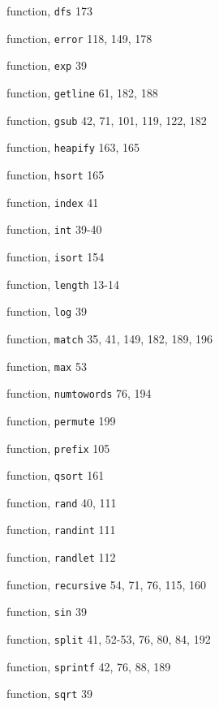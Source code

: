 \begin{multicols}{3}
\hangindent=4pc  function, \verb'dfs' 173

\hangindent=4pc  function, \verb'error' 118, 149, 178

\hangindent=4pc  function, \verb'exp' 39

\hangindent=4pc  function, \verb'getline' 61, 182, 188

\hangindent=4pc  function, \verb'gsub' 42, 71, 101, 119, 122, 182

\hangindent=4pc  function, \verb'heapify' 163, 165

\hangindent=4pc  function, \verb'hsort' 165

\hangindent=4pc  function, \verb'index' 41

\hangindent=4pc  function, \verb'int' 39-40

\hangindent=4pc  function, \verb'isort' 154

\hangindent=4pc  function, \verb'length' 13-14

\hangindent=4pc  function, \verb'log' 39

\hangindent=4pc  function, \verb'match' 35, 41, 149, 182, 189, 196

\hangindent=4pc  function, \verb'max' 53

\hangindent=4pc  function, \verb'numtowords' 76, 194

\hangindent=4pc  function, \verb'permute' 199

\hangindent=4pc  function, \verb'prefix' 105

\hangindent=4pc  function, \verb'qsort' 161

\hangindent=4pc  function, \verb'rand' 40, 111

\hangindent=4pc  function, \verb'randint' 111

\hangindent=4pc  function, \verb'randlet' 112

\hangindent=4pc  function, \verb'recursive' 54, 71, 76, 115, 160

\hangindent=4pc  function, \verb'sin' 39

\hangindent=4pc  function, \verb'split' 41, 52-53, 76, 80, 84, 192

\hangindent=4pc  function, \verb'sprintf' 42, 76, 88, 189

\hangindent=4pc  function, \verb'sqrt' 39


\end{multicols}
